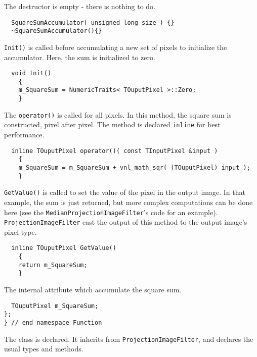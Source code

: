 \documentclass{InsightArticle}
\begin{document}
The destructor is empty - there is nothing to do.
\small \begin{verbatim}
  SquareSumAccumulator( unsigned long size ) {}
  ~SquareSumAccumulator(){}
\end{verbatim} \normalsize
\verb$Init()$ is called before accumulating a new set of pixels
to initialize the accumulator. Here, the sum is initialized to zero.
\small \begin{verbatim}
  void Init()
    {
    m_SquareSum = NumericTraits< TOuputPixel >::Zero;
    }
\end{verbatim} \normalsize
The \verb$operator()$ is called for all pixels. In this method, the square sum is
constructed, pixel after pixel. The method is declared \verb$inline$ for best
performance.
\small \begin{verbatim}
  inline TOuputPixel operator()( const TInputPixel &input )
    {
    m_SquareSum = m_SquareSum + vnl_math_sqr( (TOuputPixel) input );
    }
\end{verbatim} \normalsize
\verb$GetValue()$ is called to set the value of the pixel in the output image. In that example, the
sum is just returned, but more complex computations can be done here (see the
\verb$MedianProjectionImageFilter$'s code for an example). \verb$ProjectionImageFilter$ cast the
output of this method to the output image's pixel type.
\small \begin{verbatim}
  inline TOuputPixel GetValue()
    {
    return m_SquareSum;
    }
\end{verbatim} \normalsize
The internal attribute which accumulate the square sum.
\small \begin{verbatim}
  TOuputPixel m_SquareSum;
};
} // end namespace Function
\end{verbatim} \normalsize
The class is declared. It inherits from \verb$ProjectionImageFilter$, and declares the
usual types and methods.
\end{document}
